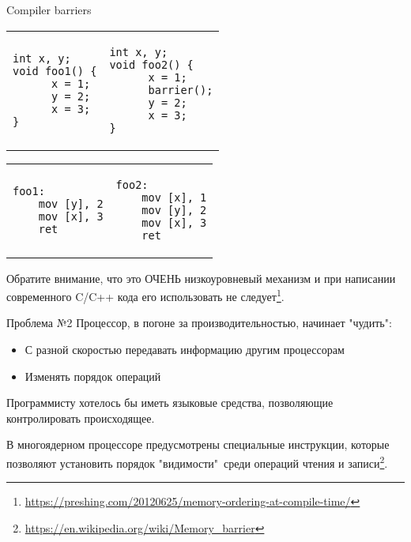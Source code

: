 \begin{frame}[t, fragile]{Compiler barriers}

\vspace{-0.5cm}
\begin{tabular}{p{} p{}}
\begin{verbatim}
int x, y;
void foo1() {
      x = 1;
      y = 2;
      x = 3;
}
\end{verbatim}

& 

\begin{verbatim}
int x, y;
void foo2() {
      x = 1;
      barrier();
      y = 2;
      x = 3;
}
\end{verbatim}
\end{tabular}

\pause
\vspace{-0.5cm}

\begin{tabular}{p{} p{}}

\begin{verbatim}
foo1:
    mov [y], 2
    mov [x], 3
    ret
\end{verbatim}

& 

\begin{verbatim}
foo2:
    mov [x], 1
    mov [y], 2
    mov [x], 3
    ret
\end{verbatim}
\end{tabular}

\pause
Обратите внимание, что это ОЧЕНЬ низкоуровневый механизм и при написании современного C/C++ кода его использовать не следует\footnote<3->{\tiny\url{https://preshing.com/20120625/memory-ordering-at-compile-time/}}.

\end{frame}


\begin{frame}{Проблема №2}
Процессор, в погоне за производительностью, начинает "чудить":
\begin{itemize}
	\pause
	\item С разной скоростью передавать информацию другим процессорам 

	\pause
	\item Изменять порядок операций
\end{itemize}

\pause
Программисту хотелось бы иметь языковые средства, позволяющие контролировать происходящее.

\pause
В многоядерном процессоре предусмотрены специальные инструкции, которые позволяют установить порядок "видимости"\ среди операций чтения и записи\footnote<5->{\tiny\url{https://en.wikipedia.org/wiki/Memory_barrier}}.

\end{frame}

